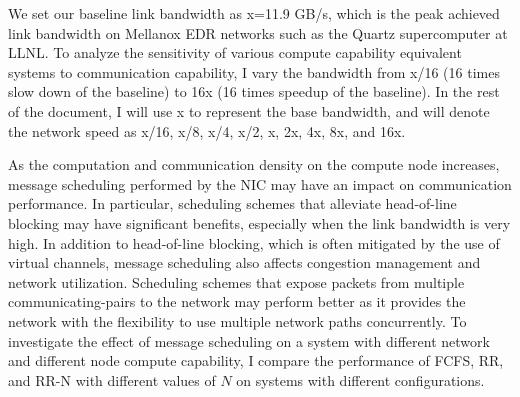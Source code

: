 \vspace{0.08in}
We set our baseline link bandwidth as x=11.9 GB/s, which is the peak achieved
link bandwidth on Mellanox EDR networks such as
the Quartz supercomputer at LLNL. To analyze the
sensitivity of various compute capability equivalent systems to communication capability, I vary the bandwidth
from x/16 (16 times slow down of the baseline) to 16x (16 times speedup of the
baseline). In the rest of the document, I will use x to represent the base
bandwidth, and will denote the network speed as x/16, x/8, x/4, x/2, x, 2x, 4x,
8x, and 16x.  


\vspace{0.08in}
As the computation and communication density
on the compute node increases, message scheduling performed by the
NIC may have an impact on
communication performance. In particular, scheduling schemes that alleviate
head-of-line blocking may have significant benefits, especially when the link
bandwidth is very high. In addition to head-of-line blocking, which is often mitigated
by the use of virtual channels, message scheduling also affects congestion management and network
utilization. Scheduling schemes that expose packets from multiple communicating-pairs
to the network may perform better as it provides the network with the flexibility to
use multiple network paths concurrently. To investigate the effect of message scheduling
on a system with different network and different node compute capability, I compare the performance
of FCFS, RR, and RR-N with different values of $N$ on systems with different configurations. 

